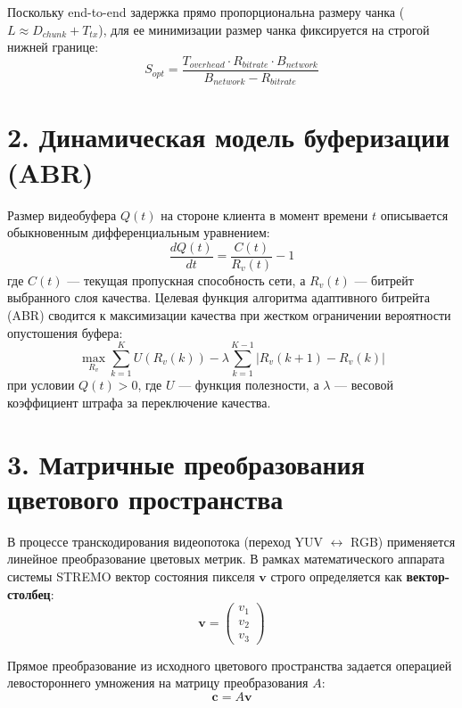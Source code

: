 \documentclass[12pt,a4paper]{article}
\begin{document}
Поскольку end-to-end задержка прямо пропорциональна размеру чанка ($L \approx D_{chunk} + T_{tx}$), для ее минимизации размер чанка фиксируется на строгой нижней границе:
\begin{equation}
S_{opt} = \frac{T_{overhead} \cdot R_{bitrate} \cdot B_{network}}{B_{network} - R_{bitrate}}
\end{equation}

\section{2. Динамическая модель буферизации (ABR)}

Размер видеобуфера $Q(t)$ на стороне клиента в момент времени $t$ описывается обыкновенным дифференциальным уравнением:
\begin{equation}
\frac{dQ(t)}{dt} = \frac{C(t)}{R_v(t)} - 1
\end{equation}
где $C(t)$ --- текущая пропускная способность сети, а $R_v(t)$ --- битрейт выбранного слоя качества. Целевая функция алгоритма адаптивного битрейта (ABR) сводится к максимизации качества при жестком ограничении вероятности опустошения буфера:
\begin{equation}
\max_{R_v} \sum_{k=1}^{K} U(R_v(k)) - \lambda \sum_{k=1}^{K-1} |R_v(k+1) - R_v(k)|
\end{equation}
при условии $Q(t) > 0$, где $U$ --- функция полезности, а $\lambda$ --- весовой коэффициент штрафа за переключение качества.

\section{3. Матричные преобразования цветового пространства}

В процессе транскодирования видеопотока (переход YUV $\leftrightarrow$ RGB) применяется линейное преобразование цветовых метрик. В рамках математического аппарата системы STREMO вектор состояния пикселя $\mathbf{v}$ строго определяется как \textbf{вектор-столбец}:
\begin{equation}
\mathbf{v} = \begin{pmatrix} v_1 \\ v_2 \\ v_3 \end{pmatrix}
\end{equation}

Прямое преобразование из исходного цветового пространства задается операцией левостороннего умножения на матрицу преобразования $A$:
\begin{equation}
\mathbf{c} = A \mathbf{v}
\end{equation}
\end{document}
